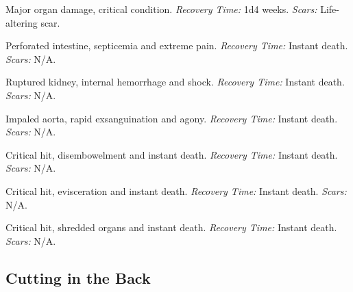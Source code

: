 \begin{description}[labelwidth=1.5em, leftmargin=*, itemsep=0.4em]
    \item[14 -] Major organ damage, critical condition. \textit{Recovery Time:} 1d4 weeks. \textit{Scars:} Life-altering scar.
    \item[15 -] Perforated intestine, septicemia and extreme pain. \textit{Recovery Time:} Instant death. \textit{Scars:} N/A.
    \item[16 -] Ruptured kidney, internal hemorrhage and shock. \textit{Recovery Time:} Instant death. \textit{Scars:} N/A.
    \item[17 -] Impaled aorta, rapid exsanguination and agony. \textit{Recovery Time:} Instant death. \textit{Scars:} N/A.
    \item[18 -] Critical hit, disembowelment and instant death. \textit{Recovery Time:} Instant death. \textit{Scars:} N/A.
    \item[19 -] Critical hit, evisceration and instant death. \textit{Recovery Time:} Instant death. \textit{Scars:} N/A.
    \item[20 -] Critical hit, shredded organs and instant death. \textit{Recovery Time:} Instant death. \textit{Scars:} N/A.
\end{description}

\subsection{Cutting in the Back}

